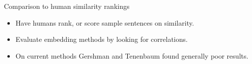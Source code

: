 \documentclass[12pt,landscape,english]{beamer}
\newcommand{\setblockcolour}[1]{
	\setbeamercolor{block title}{bg=#1,fg=black}
	\setbeamercolor{block body}{bg=#1!15,fg=black}
}
\begin{document}

\begingroup %
\begin{frame}{Comparison to human similarity rankings}
	\begin{itemize}
		\item Have humans rank, or score sample sentences on similarity.
		\item Evaluate embedding methods by looking for correlations.
		\item On current methods Gershman and Tenenbaum found generally poor results.
	\end{itemize}
\end{frame}
\end{document}
